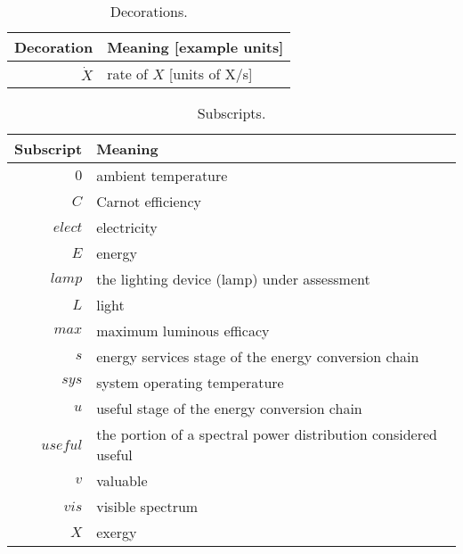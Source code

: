   
\begin{table}
\centering %
\caption{Decorations.}
\begin{tabular}{r l}
\toprule
Decoration & Meaning [example units] \\
\midrule
$\dot{X}$ & rate of $X$ [units of X/s] \\
\bottomrule
\end{tabular}
\label{tab:decorations}
\end{table}


  
\begin{table}
\centering
\caption{Subscripts.}
\begin{tabular}{r l}
\toprule
Subscript & Meaning \\
\midrule
$0$ & ambient temperature \\
$C$ & Carnot efficiency \\
$elect$ & electricity \\
$E$ & energy \\
$lamp$ & the lighting device (lamp) under assessment \\
$L$ & light \\
$max$ & maximum luminous efficacy \\
$s$ & energy services stage of the energy conversion chain \\
$sys$ & system operating temperature \\
$u$ & useful stage of the energy conversion chain \\
$useful$ & the portion of a spectral power distribution considered useful \\
$v$ & valuable \\
$vis$ & visible spectrum \\
$X$ & exergy \\
\bottomrule
\end{tabular}
\label{tab:subscripts}
\end{table}



